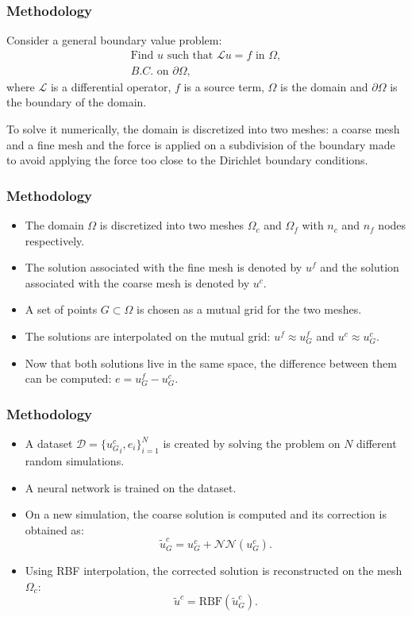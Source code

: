 \documentclass{beamer}
\begin{document}
\begin{frame}
\frametitle{Methodology}
Consider a general boundary value problem:
\[
    \begin{split}
        \text{Find } u \text{ such that } \mathcal{L}u = f \text{ in } \Omega,\\
        B.C. \text{ on } \partial \Omega,
    \end{split}
\]
where \(\mathcal{L}\) is a differential operator, \(f\) is a source term, \(\Omega\) is the domain and \(\partial \Omega\) is the boundary of the domain. 

\vspace{0.5cm}
To solve it numerically, the domain is discretized into two meshes: a coarse mesh and a fine mesh and the force is applied on a subdivision of the boundary made to avoid applying the force too close to the Dirichlet boundary conditions. 
\end{frame}

\begin{frame}
\frametitle{Methodology}
\begin{itemize}
    \item The domain \( \Omega \) is discretized into two meshes \( \Omega_c \) and \( \Omega_f \) with \( n_c \) and \( n_f \) nodes respectively. 
    \item The solution associated with the fine mesh is denoted by \( u^f \) and the solution associated with the coarse mesh is denoted by \( u^c \).
    \item A set of points \(G \subset \Omega\) is chosen as a mutual grid for the two meshes.
    \item The solutions are interpolated on the mutual grid: \( u^f \approx u^f_G \) and \( u^c \approx u^c_G \).
    \item Now that both solutions live in the same space, the difference between them can be computed: \( e = u^f_G - u^c_G \).
\end{itemize}
\end{frame}

\begin{frame}
\frametitle{Methodology}
\begin{itemize}
    \item A dataset \(\mathcal{D} = \{{u_G^c}_i, e_i\}_{i=1}^N\) is created by solving the problem on \(N\) different random simulations.
    \item A neural network is trained on the dataset.
    \item On a new simulation, the coarse solution is computed and its correction is obtained as: 
    \[
        \tilde{u}_G^c = u_G^c + \mathcal{NN}(u_G^c).
    \]
    \item Using RBF interpolation, the corrected solution is reconstructed on the mesh \( \Omega_c \):
    \[
        \tilde{u}^c = \text{RBF}(\tilde{u}_G^c).
    \]
\end{itemize}
\end{frame}
\end{document}
